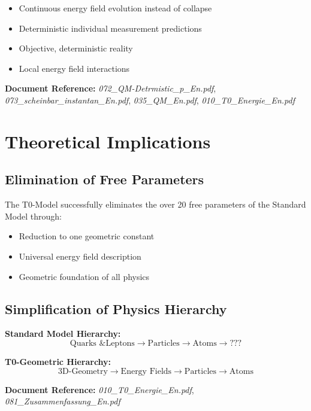 \begin{itemize}
	\item Continuous energy field evolution instead of collapse
	\item Deterministic individual measurement predictions
	\item Objective, deterministic reality
	\item Local energy field interactions
\end{itemize}

\textbf{Document Reference:} \textit{072\_QM-Detrmistic\_p\_En.pdf}, \textit{073\_scheinbar\_instantan\_En.pdf}, \textit{035\_QM\_En.pdf}, \textit{010\_T0\_Energie\_En.pdf}

\section{Theoretical Implications}

\subsection{Elimination of Free Parameters}

The T0-Model successfully eliminates the over 20 free parameters of the Standard Model through:

\begin{itemize}
	\item Reduction to one geometric constant
	\item Universal energy field description
	\item Geometric foundation of all physics
\end{itemize}

\subsection{Simplification of Physics Hierarchy}

\textbf{Standard Model Hierarchy:}
\begin{equation}
	\text{Quarks \& Leptons} \rightarrow \text{Particles} \rightarrow \text{Atoms} \rightarrow \text{???}
\end{equation}

\textbf{T0-Geometric Hierarchy:}
\begin{equation}
	\text{3D-Geometry} \rightarrow \text{Energy Fields} \rightarrow \text{Particles} \rightarrow \text{Atoms}
\end{equation}

\textbf{Document Reference:} \textit{010\_T0\_Energie\_En.pdf}, \textit{081\_Zusammenfassung\_En.pdf}

